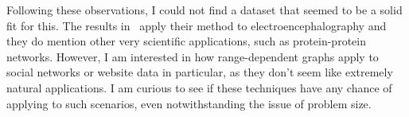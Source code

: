 Following these observations, I could not find a dataset that seemed to be a solid fit for this.
The results in~\cite{grindrod2009} apply their method to electroencephalography and they do mention other
very scientific applications, such as protein-protein networks.
However, I am interested in how range-dependent graphs apply to social networks or website data in particular, 
as they don't seem like extremely natural applications.
I am curious to see if these techniques have any chance of applying to such scenarios, even notwithstanding the issue
of problem size.